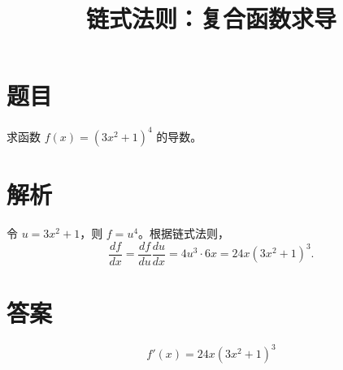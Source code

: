 \documentclass[12pt]{ctexart}
\title{链式法则：复合函数求导}
\date{}
\begin{document}
\maketitle
\section*{题目}
求函数 $f(x)=(3x^2+1)^4$ 的导数。
\section*{解析}
令 $u=3x^2+1$，则 $f=u^4$。根据链式法则，
\[
\frac{df}{dx}=\frac{df}{du}\frac{du}{dx}
=4u^3\cdot6x=24x(3x^2+1)^3.
\]
\section*{答案}
\[\boxed{f'(x)=24x(3x^2+1)^3}\]
\end{document}
